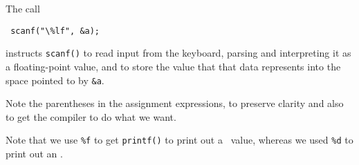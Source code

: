 The call 

\verb+ scanf("\%lf", &a); +

\noindent instructs {\tt scanf()} to read input from the keyboard,
parsing and interpreting it as a floating-point value, and to store the
value that that data represents into the space pointed to by {\tt \&a}.

Note the parentheses in the assignment expressions, to preserve clarity
and also to get the compiler to do what we want.

Note that we use {\tt \%f} to get {\tt printf()} to print out a \double\
value, whereas we used {\tt \%d} to print out an \int.




